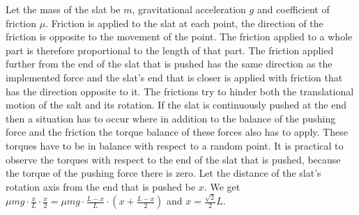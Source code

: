 {\ifEngSolution
Let the mass of the slat be $m$, gravitational acceleration $g$ and coefficient of friction $\mu$. Friction is applied to the slat at each point, the direction of the friction is opposite to the movement of the point. The friction applied to a whole part is therefore proportional to the length of that part. The friction applied further from the end of the slat that is pushed has the same direction as the implemented force and the slat’s end that is closer is applied with friction that has the direction opposite to it. The frictions try to hinder both the translational motion of the salt and its rotation. If the slat is continuously pushed at the end then a situation has to occur where in addition to the balance of the pushing force and the friction the torque balance of these forces also has to apply. These torques have to be in balance with respect to a random point. It is practical to observe the torques with respect to the end of the slat that is pushed, because the torque of the pushing force there is zero. Let the distance of the slat’s rotation axis from the end that is pushed be $x$. We get $\mu mg \cdot \frac{x}{L} \cdot \frac{x}{2}=\mu mg \cdot \frac{L-x}{L} \cdot \left(x+\frac{L-x}{2}\right)$ and $x=\frac{\sqrt{2}}{2}L$.
\fi
}